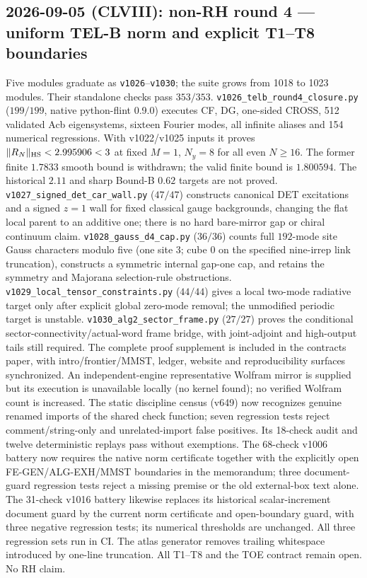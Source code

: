 \subsection*{2026-09-05 (CLVIII): non-RH round 4 --- uniform TEL-B norm and explicit T1--T8 boundaries}
Five modules graduate as \texttt{v1026}--\texttt{v1030}; the suite grows
from 1018 to 1023 modules. Their standalone checks pass $353/353$.
\texttt{v1026\_\allowbreak telb\_\allowbreak round4\_\allowbreak closure.py}
($199/199$, native python-flint 0.9.0) executes CF, DG, one-sided CROSS,
512 validated Acb eigensystems, sixteen Fourier modes, all infinite aliases
and 154 numerical regressions. With v1022/v1025 inputs it proves
$\|R_N\|_{\rm HS}<2.995906<3$ at fixed $M=1$, $N_y=8$ for all even $N\ge16$. The former finite
$1.7833$ smooth bound is withdrawn; the valid finite bound is $1.800594$.
The historical $2.11$ and sharp Bound-B $0.62$ targets are not proved.
\texttt{v1027\_\allowbreak signed\_\allowbreak det\_\allowbreak car\_\allowbreak wall.py}
($47/47$) constructs canonical DET excitations and a signed $z=1$ wall
for fixed classical gauge backgrounds, changing the flat local parent
to an additive one; there is no hard bare-mirror gap or chiral continuum claim.
\texttt{v1028\_\allowbreak gauss\_\allowbreak d4\_\allowbreak cap.py}
($36/36$) counts full $192$-mode site Gauss characters modulo five
(one site 3; cube 0 on the specified nine-irrep link truncation),
constructs a symmetric internal gap-one cap, and retains the symmetry
and Majorana selection-rule obstructions.
\texttt{v1029\_\allowbreak local\_\allowbreak tensor\_\allowbreak constraints.py}
($44/44$) gives a local two-mode radiative target only after explicit
global zero-mode removal; the unmodified periodic target is unstable.
\texttt{v1030\_\allowbreak alg2\_\allowbreak sector\_\allowbreak frame.py}
($27/27$) proves the conditional sector-connectivity/actual-word frame
bridge, with joint-adjoint and high-output tails still required.
The complete proof supplement is included in the contracts paper, with
intro/frontier/MMST, ledger, website and reproducibility surfaces synchronized.
An independent-engine representative Wolfram mirror is supplied but its
execution is unavailable locally (no kernel found); no verified Wolfram
count is increased. The static discipline census (v649) now recognizes
genuine renamed imports of the shared check function; seven regression tests
reject comment/string-only and unrelated-import false positives. Its
18-check audit and twelve deterministic replays pass without exemptions.
The 68-check v1006 battery now requires the native norm certificate together
with the explicitly open FE-GEN/ALG-EXH/MMST boundaries in the memorandum;
three document-guard regression tests reject a missing premise or the old
external-box text alone. The 31-check v1016 battery likewise replaces its
historical scalar-increment document guard by the current norm certificate
and open-boundary guard, with three negative regression tests; its numerical
thresholds are unchanged. All three regression sets run in CI. The atlas
generator removes trailing whitespace introduced by one-line truncation.
All T1--T8 and the TOE contract remain open. No RH claim.

